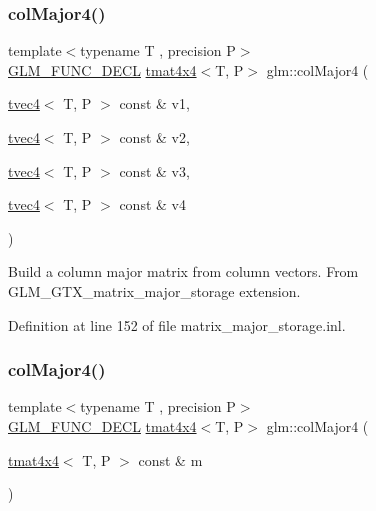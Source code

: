 \subsubsection{\texorpdfstring{colMajor4()}{colMajor4()}\hspace{0.1cm}{\footnotesize\ttfamily [1/2]}}
{\footnotesize\ttfamily template$<$typename T , precision P$>$ \\
\mbox{\hyperlink{setup_8hpp_ab2d052de21a70539923e9bcbf6e83a51}{G\+L\+M\+\_\+\+F\+U\+N\+C\+\_\+\+D\+E\+CL}} \mbox{\hyperlink{structglm_1_1tmat4x4}{tmat4x4}}$<$T, P$>$ glm\+::col\+Major4 (\begin{DoxyParamCaption}\item[{\mbox{\hyperlink{structglm_1_1tvec4}{tvec4}}$<$ T, P $>$ const \&}]{v1,  }\item[{\mbox{\hyperlink{structglm_1_1tvec4}{tvec4}}$<$ T, P $>$ const \&}]{v2,  }\item[{\mbox{\hyperlink{structglm_1_1tvec4}{tvec4}}$<$ T, P $>$ const \&}]{v3,  }\item[{\mbox{\hyperlink{structglm_1_1tvec4}{tvec4}}$<$ T, P $>$ const \&}]{v4 }\end{DoxyParamCaption})}

Build a column major matrix from column vectors. From G\+L\+M\+\_\+\+G\+T\+X\+\_\+matrix\+\_\+major\+\_\+storage extension. 

Definition at line 152 of file matrix\+\_\+major\+\_\+storage.\+inl.

\mbox{\label{group__gtx__matrix__major__storage_ga7592acfd27da055e2d7c39564cf8803d}} 
\subsubsection{\texorpdfstring{colMajor4()}{colMajor4()}\hspace{0.1cm}{\footnotesize\ttfamily [2/2]}}
{\footnotesize\ttfamily template$<$typename T , precision P$>$ \\
\mbox{\hyperlink{setup_8hpp_ab2d052de21a70539923e9bcbf6e83a51}{G\+L\+M\+\_\+\+F\+U\+N\+C\+\_\+\+D\+E\+CL}} \mbox{\hyperlink{structglm_1_1tmat4x4}{tmat4x4}}$<$T, P$>$ glm\+::col\+Major4 (\begin{DoxyParamCaption}\item[{\mbox{\hyperlink{structglm_1_1tmat4x4}{tmat4x4}}$<$ T, P $>$ const \&}]{m }\end{DoxyParamCaption})}

